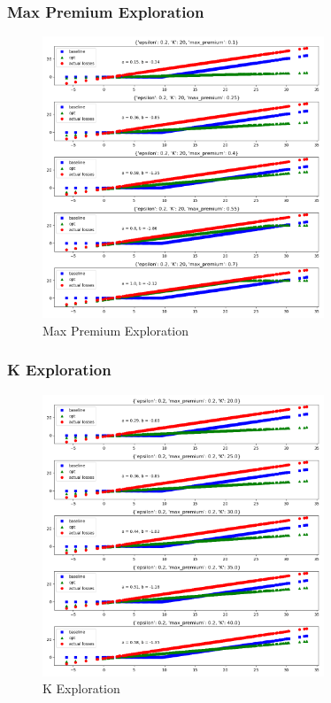 \documentclass[11pt]{article}
\begin{document}
        \subsubsection*{Max Premium Exploration}
        \begin{figure}[H]
            \centering
            \caption{Max Premium Exploration}
            \includegraphics[width=0.75\textwidth]{../../output/figures/CVaR3/max_premium_exploration.png}
        \end{figure}


        \FloatBarrier

        \subsubsection*{K Exploration}
        \begin{figure}[H]
            \centering
            \caption{K Exploration}
            \includegraphics[width=0.75\textwidth]{../../output/figures/CVaR3/K_exploration.png}
        \end{figure}
\end{document}
